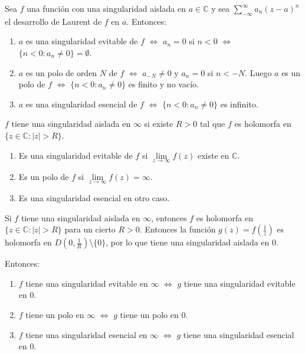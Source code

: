 \begin{proposition}
    Sea $f$ una función con una singularidad aislada en $a \in \mathbb{C}$ y sea $\sum_{-\infty}^\infty a_n(z-a)^n$ el desarrollo de Laurent de $f$ en $a$.
    Entonces:
    \begin{enumerate}
        \item $a$ es una singularidad evitable de $f$ $\Leftrightarrow$ $a_n = 0$ si $n < 0$ $\Leftrightarrow$ $\{n < 0 : a_n \neq 0\} = \emptyset$.
        \item $a$ es un polo de orden $N$ de $f$ $\Leftrightarrow$ $a_{-N} \neq 0$ y $a_n = 0$ si $n < -N$.
              Luego $a$ es un polo de $f$ $\Leftrightarrow$ $\{n < 0 : a_n \neq 0\}$ es finito y no vacío.
        \item $a$ es una singularidad esencial de $f$ $\Leftrightarrow$ $\{n < 0 : a_n \neq 0\}$ es infinito.
    \end{enumerate}
\end{proposition}

\begin{definition}
    $f$ tiene una singularidad aislada en $\infty$ si existe $R > 0$ tal que $f$ es holomorfa en $\{z \in \mathbb{C} : |z| > R\}$.
    \begin{enumerate}
        \item Es una singularidad evitable de $f$ si $\lim\limits_{z \to \infty} f(z)$ existe en $\mathbb{C}$.
        \item Es un polo de $f$ si $\lim\limits_{z \to \infty} f(z) = \infty$.
        \item Es una singularidad esencial en otro caso.
    \end{enumerate}
\end{definition}

Si $f$ tiene una singularidad aislada en $\infty$, entonces $f$ es holomorfa en $\{z \in \mathbb{C} : |z| > R\}$ para un cierto $R > 0$.
Entonces la función $g(z) = f\left(\frac{1}{z}\right)$ es holomorfa en $D\left(0, \frac{1}{R}\right) \setminus \{0\}$, por lo que tiene una singularidad aislada en 0.

Entonces:
\begin{enumerate}
    \item $f$ tiene una singularidad evitable en $\infty$ $\Leftrightarrow$ $g$ tiene una singularidad evitable en 0.
    \item $f$ tiene un polo en $\infty$ $\Leftrightarrow$ $g$ tiene un polo en 0.
    \item $f$ tiene una singularidad esencial en $\infty$ $\Leftrightarrow$ $g$ tiene una singularidad esencial en 0.
\end{enumerate}

